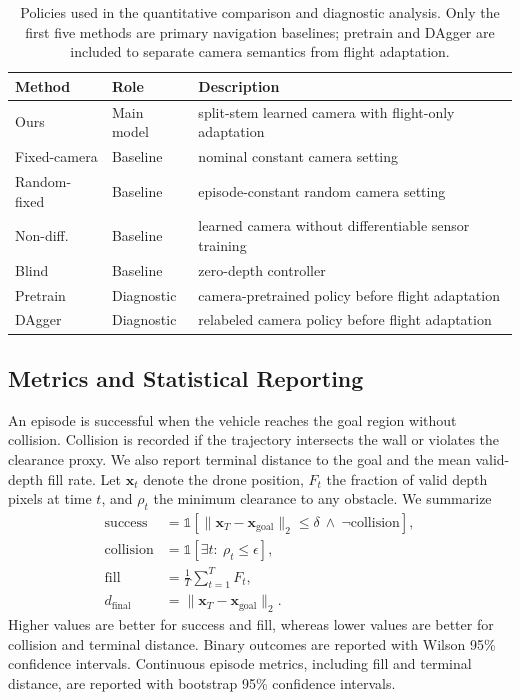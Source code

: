\documentclass[letterpaper,journal]{IEEEtran}
\begin{document}
\begin{table}[t]
\centering
\small
\begin{tabular}{lll}
\toprule
Method & Role & Description \\
\midrule
Ours & Main model & split-stem learned camera with flight-only adaptation \\
Fixed-camera & Baseline & nominal constant camera setting \\
Random-fixed & Baseline & episode-constant random camera setting \\
Non-diff. & Baseline & learned camera without differentiable sensor training \\
Blind & Baseline & zero-depth controller \\
Pretrain & Diagnostic & camera-pretrained policy before flight adaptation \\
DAgger & Diagnostic & relabeled camera policy before flight adaptation \\
\bottomrule
\end{tabular}
\caption{Policies used in the quantitative comparison and diagnostic analysis.
Only the first five methods are primary navigation baselines; pretrain and
DAgger are included to separate camera semantics from flight adaptation.}
\label{tab:methods}
\end{table}

\subsection{Metrics and Statistical Reporting}
An episode is successful when the vehicle reaches the goal region without
collision. Collision is recorded if the trajectory intersects the wall or
violates the clearance proxy. We also report terminal distance to the goal and
the mean valid-depth fill rate. Let $\mathbf{x}_t$ denote the drone position,
$F_t$ the fraction of valid depth pixels at time $t$, and $\rho_t$ the minimum
clearance to any obstacle. We summarize
\begin{align}
\mathrm{success} &= \mathbb{1}[\|\mathbf{x}_T-\mathbf{x}_{\mathrm{goal}}\|_2 \le \delta
\ \wedge\ \neg \mathrm{collision}], \\
\mathrm{collision} &= \mathbb{1}[\exists t:\ \rho_t \le \epsilon], \\
\mathrm{fill} &= \frac{1}{T}\sum_{t=1}^{T} F_t, \\
d_{\mathrm{final}} &= \|\mathbf{x}_T-\mathbf{x}_{\mathrm{goal}}\|_2 .
\end{align}
Higher values are better for success and fill, whereas lower values are better
for collision and terminal distance.
Binary outcomes are reported with Wilson 95\% confidence intervals. Continuous
episode metrics, including fill and terminal distance, are reported with
bootstrap 95\% confidence intervals.
\end{document}
